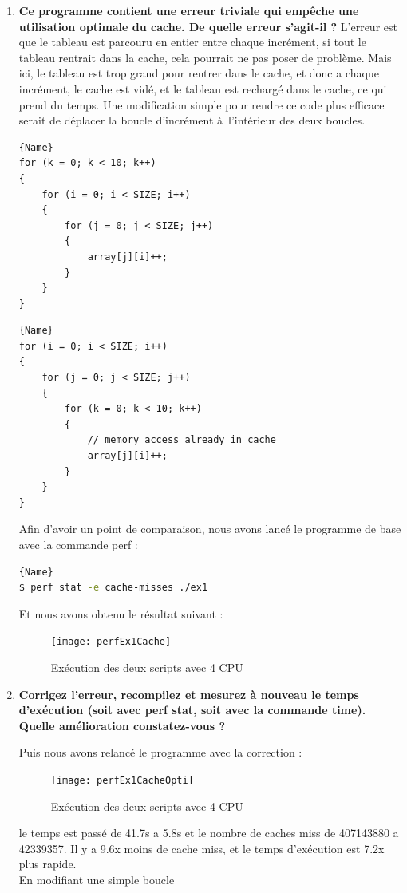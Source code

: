\documentclass[
	a4paper, %
	10pt, %
]{CSUniSchoolLabReport}
\begin{document}
\begin{enumerate}[label=\textbf{\arabic*}]
	\item \textbf{Ce programme contient une erreur triviale qui empêche une utilisation optimale du cache. De quelle erreur s’agit-il ?}
L'erreur est que le tableau est parcouru en entier entre chaque incr\'ement, si tout le tableau rentrait dans la cache, cela pourrait ne pas poser de probl\`eme.
Mais ici, le tableau est trop grand pour rentrer dans le cache, et donc a chaque incr\'ement, le cache est vidé, et le tableau est rechargé dans le cache, ce qui prend du temps.
Une modification simple pour rendre ce code plus efficace serait de d\'eplacer la boucle d'incr\'ement \`a\ l'int\'erieur des deux boucles.

\noindent\begin{minipage}{.45\textwidth}
	\begin{lstlisting}[style=CStyle, caption=Code fournis, firstnumber=1]{Name}
for (k = 0; k < 10; k++)
{
	for (i = 0; i < SIZE; i++)
	{
		for (j = 0; j < SIZE; j++)
		{
			array[j][i]++;
		}
	}
}
	\end{lstlisting}
	\end{minipage}\hfill
	\begin{minipage}{.45\textwidth}
	\begin{lstlisting}[style=CStyle, caption=Code modifié, firstnumber=1]{Name}
for (i = 0; i < SIZE; i++)
{
	for (j = 0; j < SIZE; j++)
	{
		for (k = 0; k < 10; k++)
		{
			// memory access already in cache
			array[j][i]++;
		}
	}
}
	\end{lstlisting}
\end{minipage}

Afin d'avoir un point de comparaison, nous avons lancé le programme de base avec la commande perf :
\begin{lstlisting}[language=bash, firstnumber=1]{Name}
$ perf stat -e cache-misses ./ex1
\end{lstlisting}
Et nous avons obtenu le r\'esultat suivant :
\begin{figure}[H]
	\centering
	\texttt{[image: perfEx1Cache]}
	\caption{Ex\'ecution des deux scripts avec 4 CPU}
	\label{fig:runEx3Share}
\end{figure}

	\item \textbf{Corrigez l’erreur, recompilez et mesurez à nouveau le temps d’exécution (soit avec perf stat, soit avec la commande time). Quelle amélioration constatez-vous ?}


Puis nous avons relancé le programme avec la correction :
\begin{figure}[H]
	\centering
	\texttt{[image: perfEx1CacheOpti]}
	\caption{Ex\'ecution des deux scripts avec 4 CPU}
	\label{fig:runEx3Share}
\end{figure}
le temps est passé de 41.7s a 5.8s et le nombre de caches miss de 407143880 a 42339357. Il y a 9.6x moins de cache miss, et le temps d'ex\'ecution est 7.2x plus rapide.\\
En modifiant une simple boucle


\end{enumerate}
\end{document}
